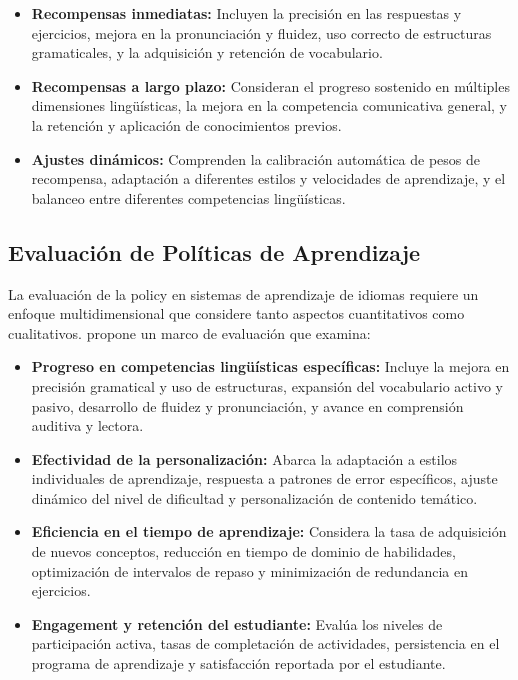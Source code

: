 \begin{itemize}
  \item \textbf{Recompensas inmediatas:} Incluyen la precisión en las respuestas y ejercicios, mejora en la pronunciación y fluidez, uso correcto de estructuras gramaticales, y la adquisición y retención de vocabulario.

  \item \textbf{Recompensas a largo plazo:} Consideran el progreso sostenido en múltiples dimensiones lingüísticas, la mejora en la competencia comunicativa general, y la retención y aplicación de conocimientos previos.

  \item \textbf{Ajustes dinámicos:} Comprenden la calibración automática de pesos de recompensa, adaptación a diferentes estilos y velocidades de aprendizaje, y el balanceo entre diferentes competencias lingüísticas.
\end{itemize}

\subsection{Evaluación de Políticas de Aprendizaje}

La evaluación de la \gls{policy} en sistemas de aprendizaje de idiomas requiere un enfoque multidimensional que considere tanto aspectos cuantitativos como cualitativos. \cite{williams2017educational} propone un marco de evaluación que examina:

\begin{itemize}
  \item \textbf{Progreso en competencias lingüísticas específicas:} Incluye la mejora en precisión gramatical y uso de estructuras, expansión del vocabulario activo y pasivo, desarrollo de fluidez y pronunciación, y avance en comprensión auditiva y lectora.

  \item \textbf{Efectividad de la personalización:} Abarca la adaptación a estilos individuales de aprendizaje, respuesta a patrones de error específicos, ajuste dinámico del nivel de dificultad y personalización de contenido temático.

  \item \textbf{Eficiencia en el tiempo de aprendizaje:} Considera la tasa de adquisición de nuevos conceptos, reducción en tiempo de dominio de habilidades, optimización de intervalos de repaso y minimización de redundancia en ejercicios.

  \item \textbf{Engagement y retención del estudiante:} Evalúa los niveles de participación activa, tasas de completación de actividades, persistencia en el programa de aprendizaje y satisfacción reportada por el estudiante.
\end{itemize}

